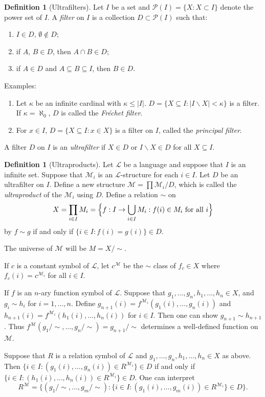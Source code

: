 \documentclass{amsart}
\theoremstyle{definition}
\newtheorem{definition}[theorem]{Definition}
\numberwithin{equation}{section}
\begin{document}
\begin{definition}[Ultrafilters]
	Let $I$ be a set and $\mathcal{P}(I) = \{ X : X \subset I\}$
	denote the power set of $I$.
	A \emph{filter} on $I$ is a collection $D \subset \mathcal{P}(I)$ such that:
	\begin{enumerate}[label = {\roman*)}]
		\item $I \in D$, $\emptyset \not\in D$;
		\item if $A$, $B \in D$, then $A \cap B \in D$;
		\item if $A\in D$ and $A \subseteq B \subseteq I$, then $B \in D$.
	\end{enumerate}
	Examples:
	\begin{enumerate}
		\item Let $\kappa$ be an infinite cardinal with $\kappa \le |I|$.
		      $D = \{ X \subseteq I : |I \backslash X| < \kappa\}$ is a filter.
		      If $\kappa = \aleph_0$, $D$ is called the \emph{Fr\'echet filter}.
		\item For $x \in I$, $D = \{X\subseteq I: x\in X\}$ is a filter on $I$, called the \emph{principal filter}.
	\end{enumerate}

	A filter $D$ on $I$ is an \emph{ultrafilter} if $X \in D$ or $I\backslash X \in D$ for all $X \subseteq I$.
\end{definition}

\begin{definition}[Ultraproducts]
	Let $\mathcal{L}$ be a language and suppose that $I$ is an infinite set.
	Suppose that $\mathcal{M}_i$ is an $\mathcal{L}$-structure for each $i \in I$.
	Let $D$ be an ultrafilter on $I$.
	Define a new structure $\mathcal{M} = \prod \mathcal{M}_i / D$,
	which is called the \emph{ultraproduct} of the $\mathcal{M}_i$ using $D$.
	Define a relation $\sim$ on
	\[
		X = \prod_{i\in I}M_i = \Bigl\{ f: I \to \bigcup_{i\in I}M_i : f(i)\in M_i \text{ for all $i$} \Bigr\}
	\]
	by $f\sim g$ if and only if $\{i \in I:f(i) = g(i)\} \in D$.

	The universe of $\mathcal{M}$ will be $M = X / \sim$.

	If $c$ is a constant symbol of $\mathcal{L}$,
	let $c^{\mathcal{M}}$ be the $\sim$ class of $f_c \in X$ where $f_c(i) = c^{\mathcal{M}_i}$ for all $i\in I$.

	If $f$ is an $n$-ary function symbol of $\mathcal{L}$.
	Suppose that $g_1,\dots,g_n,h_1,\dots,h_n\in X$,
	and $g_i \sim h_i$ for $i = 1, \dots,n$.
	Define $g_{n+1}(i) = f^{\mathcal{M}_i}(g_1(i),\dots,g_n(i))$ and
	$h_{n+1}(i) = f^{\mathcal{M}_i}(h_1(i),\dots,h_n(i))$ for $i \in I$.
	Then one can show $g_{n+1} \sim h_{n+1}$.
	Thus $f^{\mathcal{M}}(g_1/\sim,\dots,g_n/\sim) = g_{n+1}/\sim$ determines a well-defined function on $\mathcal{M}$.

	Suppose that $R$ is a relation symbol of $\mathcal{L}$ and
	$g_1,\dots,g_n,h_1,\dots,h_n\in X$ as above.
	Then $\{i\in I: (g_1(i),\dots,g_n(i)) \in R^{\mathcal{M}_i}\} \in D$ if and only if
	$\{i \in I: (h_1(i),\dots,h_n(i)) \in R^{\mathcal{M}_i}\} \in D$.
	One can interpret
	\[
		R^{\mathcal{M}} = \{(g_1/\sim,\dots,g_m/\sim): \{ i\in I: (g_1(i),\dots,g_m(i)) \in R^{\mathcal{M}_i}\} \in D\}.
	\]
\end{definition}
\end{document}
